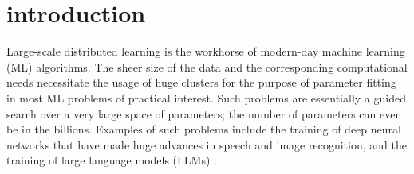 \documentclass[journal,draftcls,onecolumn]{IEEEtran}
\theoremstyle{mystyle}
\newcommand{\sifat}[1]{\marginpar{+}{\bf Sifat's remark}: {\em #1}}
\begin{document}
   


\section{introduction}
Large-scale distributed learning is the workhorse of modern-day machine learning (ML) algorithms. The sheer size of the data and the corresponding computational needs necessitate the usage of huge clusters for the purpose of parameter fitting in most ML problems of practical interest. Such problems are essentially a guided search over a very large space of parameters; the number of parameters can even be in the billions. Examples of such problems include the training of deep neural networks \cite{GoodBengCour16} that have made huge advances in speech and image recognition, and the training of large language models (LLMs) \cite{zhao2024surveylargelanguagemodels}.

\end{document}
